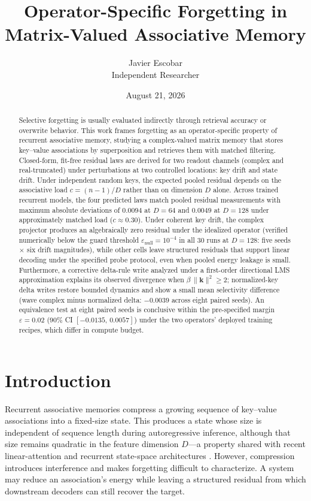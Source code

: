 \documentclass[11pt,a4paper]{article}
\title{\textbf{Operator-Specific Forgetting in Matrix-Valued Associative Memory}}
\author{Javier Escobar\\
  Independent Researcher}
\date{August 21, 2026}
\begin{document}
\maketitle

\begin{abstract}
Selective forgetting is usually evaluated indirectly through retrieval accuracy or overwrite behavior. This work frames forgetting as an operator-specific property of recurrent associative memory, studying a complex-valued matrix memory that stores key--value associations by superposition and retrieves them with matched filtering. Closed-form, fit-free residual laws are derived for two readout channels (complex and real-truncated) under perturbations at two controlled locations: key drift and state drift. Under independent random keys, the expected pooled residual depends on the associative load $c=(n-1)/D$ rather than on dimension $D$ alone. Across trained recurrent models, the four predicted laws match pooled residual measurements with maximum absolute deviations of $0.0094$ at $D=64$ and $0.0049$ at $D=128$ under approximately matched load ($c \approx 0.30$). Under coherent key drift, the complex projector produces an algebraically zero residual under the idealized operator (verified numerically below the guard threshold $\varepsilon_{\text{null}} = 10^{-4}$ in all $30$ runs at $D=128$: five seeds $\times$ six drift magnitudes), while other cells leave structured residuals that support linear decoding under the specified probe protocol, even when pooled energy leakage is small. Furthermore, a corrective delta-rule write analyzed under a first-order directional LMS approximation explains its observed divergence when $\beta\,\|\mathbf{k}\|^2 \ge 2$; normalized-key delta writes restore bounded dynamics and show a small mean selectivity difference (wave complex minus normalized delta: $-0.0039$ across eight paired seeds). An equivalence test at eight paired seeds is conclusive within the pre-specified margin $\varepsilon=0.02$ ($90\%$ CI $[-0.0135,\,0.0057]$) under the two operators' deployed training recipes, which differ in compute budget.
\end{abstract}

\section{Introduction}\label{sec:intro}

Recurrent associative memories compress a growing sequence of key--value associations into a fixed-size state. This produces a state whose size is independent of sequence length during autoregressive inference, although that size remains quadratic in the feature dimension $D$---a property shared with recent linear-attention and recurrent state-space architectures \citep{katharopoulos2020transformers,schlag2021fastweight,yang2024deltanet,yang2025gateddelta,gu2023mamba}. However, compression introduces interference and makes forgetting difficult to characterize. A system may reduce an association's energy while leaving a structured residual from which downstream decoders can still recover the target.
\end{document}
